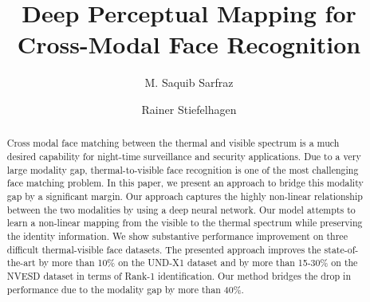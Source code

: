 \documentclass[smallextended,natbib]{svjour3}       \usepackage{graphicx}
\begin{document}
\title{Deep Perceptual Mapping for Cross-Modal Face Recognition}




\author{M. Saquib Sarfraz         \and
        Rainer Stiefelhagen }







\maketitle
\begin{abstract}
Cross modal face matching between the thermal and visible spectrum is a much desired capability for night-time surveillance and security applications. Due to a very large modality gap, thermal-to-visible face recognition is one of the most challenging face matching problem. In this paper, we present an approach to bridge this modality gap by a significant margin. Our approach captures the highly non-linear relationship between the two modalities by using a deep neural network. Our model attempts to learn a non-linear mapping from the visible to the thermal spectrum while preserving the identity information. We show substantive performance improvement on three difficult thermal-visible face datasets. The presented approach improves the state-of-the-art by more than 10\% on the UND-X1 dataset and by more than 15-30\% on the NVESD dataset in terms of Rank-1 identification. Our method bridges the drop in performance due to the modality gap by more than 40\%. 
\end{abstract}
\end{document}
